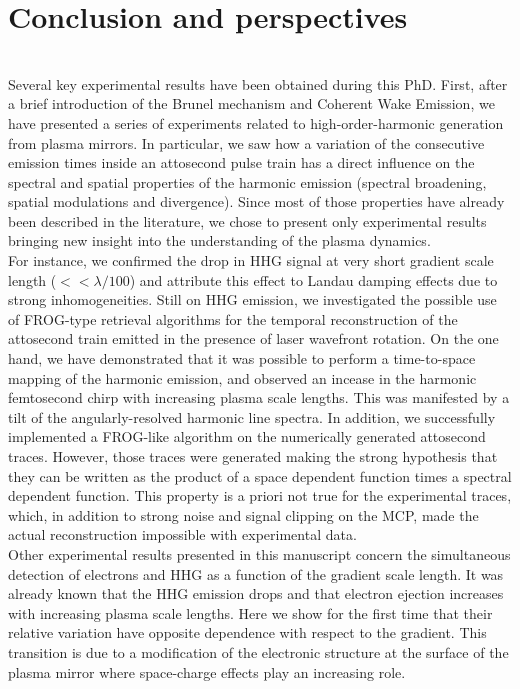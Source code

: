 \chapter*{Conclusion and perspectives}
\thispagestyle{empty}

\noindent {}\\

Several key experimental results have been obtained during this PhD. First, after a brief introduction of the Brunel mechanism and Coherent Wake Emission, we have presented a series of experiments related to high-order-harmonic generation from plasma mirrors. In particular, we saw how a variation of the consecutive emission times inside an attosecond pulse train has a direct influence on the spectral and spatial properties of the harmonic emission (spectral broadening, spatial modulations and divergence). Since most of those properties have already been described in the literature, we chose to present only experimental results bringing new insight into the understanding of the plasma dynamics. \\
\indent For instance, we confirmed the drop in HHG signal at very short gradient scale length ($<<\lambda /100$) and attribute this effect to Landau damping effects due to strong inhomogeneities. Still on HHG emission, we investigated the possible use of FROG-type retrieval algorithms for the temporal reconstruction of the attosecond train emitted in the presence of laser wavefront rotation. On the one hand, we have demonstrated that it was possible to perform a time-to-space mapping of the harmonic emission, and observed an incease in the harmonic femtosecond chirp with increasing plasma scale lengths. This was manifested by a tilt of the angularly-resolved harmonic line spectra. In addition, we successfully  implemented a FROG-like algorithm on the numerically generated attosecond traces. However, those traces were generated making the strong hypothesis that they can be written as the product of a space dependent function times a spectral dependent function. This property is a priori not true for the experimental traces, which, in addition to strong noise and signal clipping on the MCP,  made the actual reconstruction impossible with experimental data.\\
\indent Other experimental results presented in this manuscript concern the simultaneous detection of electrons and HHG as a function of the gradient scale length. It was already known that the HHG emission drops and that electron ejection increases with increasing plasma scale lengths. Here we show for the first time that their relative variation have opposite dependence with respect to the gradient. This transition is due to a modification of the electronic structure at the surface of the plasma mirror where space-charge effects play an increasing role. \\
